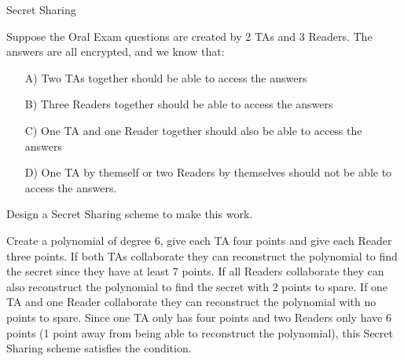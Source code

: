 \begin{homeworkProblem}{Secret Sharing}
    
    Suppose the Oral Exam questions are created by 2 TAs and 3 Readers. The 
    answers are all encrypted, and we know that:

    \begin{itemize}
        \item[A)] Two TAs together should be able to access the answers
        \item[B)] Three Readers together should be able to access the answers
        \item[C)] One TA and one Reader together should also be able to access the answers
        \item[D)] One TA by themself or two Readers by themselves should not be 
        able to access the answers.
    \end{itemize}

    Design a Secret Sharing scheme to make this work.

    \solution    
    Create a polynomial of degree 6, give each TA four points and give each Reader
    three points. If both TAs collaborate they can reconstruct the polynomial to
    find the secret since they have at least 7 points. If all Readers collaborate 
    they can also reconstruct the polynomial to find the secret with 2 points to
    spare. If one TA and one Reader collaborate they can reconstruct the polynomial
    with no points to spare. Since one TA only has four points and two Readers only
    have 6 points (1 point away from being able to reconstruct the polynomial), this
    Secret Sharing scheme satisfies the condition. 

\end{homeworkProblem}